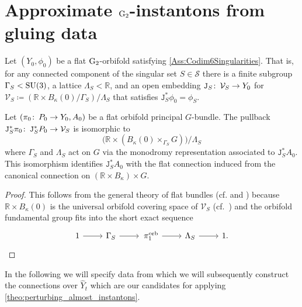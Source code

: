 \documentclass[11pt,a4paper]{scrartcl}
\newcommand{\col}{\colon \thinspace}
\newcommand{\piorb}{\mathop{}\pi_1^{\textup{orb}}}
\newcommand{\G}{\textup{G}}
\newcommand{\SU}{\textup{SU}}
\numberwithin{equation}{section}
\theoremstyle{plain}
\theoremstyle{definition}
\theoremstyle{remark}
\begin{document}
\section{Approximate $\G_2$-instantons from gluing data}\label{sec:approxG2instantons_from_gluingdata}

Let $(Y_0,\phi_0)$ be a flat $\G_2$-orbifold satisfying \autoref{Ass:Codim6Singularities}. That is, for any connected component of the singular set $S\in \mathcal{S}$ there is a finite subgroup $\Gamma_S < \SU(3)$, a lattice $\Lambda_S < \mathbb{R}$, and an open embedding $\mathtt{J}_S \col \mathcal{V}_S \to Y_0$ for $\mathcal{V}_S \coloneqq (\mathbb{R}\times B_\kappa(0)/\Gamma_S)/\Lambda_S$ that satisfies $\mathtt{J}_S^*\phi_0 = \phi_S$.

\begin{lemma}
Let $(\pi_0\col P_0 \to Y_0,A_0)$ be a flat orbifold principal $G$-bundle. The pullback $\mathtt{J}_S^*\pi_0 \col \mathtt{J}_S^*P_0 \to \mathcal{V}_S$ is isomorphic to \[ \big(\mathbb{R} \times (B_{\kappa}(0) \times_{\Gamma_S} G)\big)/\Lambda_S\] where $\Gamma_S$ and $\Lambda_S$ act on $G$ via the monodromy representation associated to $\mathtt{J}_S^*A_0$. This isomorphism identifies $\mathtt{J}^*_SA_0$ with the flat connection induced from the canonical connection on $(\mathbb{R}\times B_\kappa)\times G$.
\end{lemma}
\begin{proof}
This follows from the general theory of flat bundles (cf. \cite[Proposition~2.2.3]{DonaldsonKronheimer} and \cite[Theorem~2.36]{ALR-Orbifolds_and_stringy_topology}) because $\mathbb{R}\times B_\kappa(0)$ is the universal orbifold covering space of $\mathcal{V}_S$ (cf.~\cite[Example~2.20]{ALR-Orbifolds_and_stringy_topology}) and the orbifold fundamental group fits into the short exact sequence
\begin{equation*}
\begin{tikzcd}
1 \arrow[r] & \Gamma_S \arrow[r] & \piorb \arrow[r] & \Lambda_S \arrow[r] & 1.
\end{tikzcd}\qedhere
\end{equation*}
\end{proof}

In the following we will specify data from which we will subsequently construct the connections over $\hat{Y}_t$ which are our candidates for applying \autoref{theo:perturbing_almost_instantons}.
\end{document}
